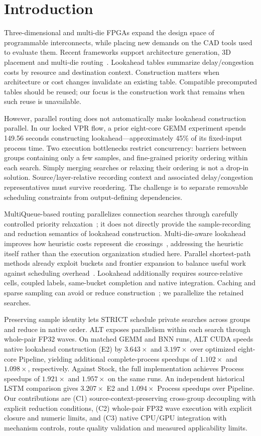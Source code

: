\section{Introduction}
Three-dimensional and multi-die FPGAs expand the design space of programmable interconnects, while placing new demands on the CAD tools used to evaluate them. Recent frameworks support architecture generation, 3D placement and multi-die routing~\cite{lazagna,flatland,multidie}. Lookahead tables summarize delay/congestion costs by resource and destination context. Construction matters when architecture or cost changes invalidate an existing table. Compatible precomputed tables should be reused; our focus is the construction work that remains when such reuse is unavailable.

However, parallel routing does not automatically make lookahead construction parallel. In our locked VPR flow, a prior eight-core GEMM experiment spends 149.56 seconds constructing lookahead---approximately 45\% of its fixed-input process time. Two execution bottlenecks restrict concurrency: barriers between groups containing only a few samples, and fine-grained priority ordering within each search. Simply merging searches or relaxing their ordering is not a drop-in solution. Source/layer-relative recording context and associated delay/congestion representatives must survive reordering. The challenge is to separate removable scheduling constraints from output-defining dependencies.

MultiQueue-based routing parallelizes connection searches through carefully controlled priority relaxation~\cite{multiqueue}; it does not directly provide the sample-recording and reduction semantics of lookahead construction. Multi-die-aware lookahead improves how heuristic costs represent die crossings~\cite{multidie}, addressing the heuristic itself rather than the execution organization studied here. Parallel shortest-path methods already exploit buckets and frontier expansion to balance useful work against scheduling overhead~\cite{delta,gpu_sssp}. Lookahead additionally requires source-relative cells, coupled labels, same-bucket completion and native integration. Caching and sparse sampling can avoid or reduce construction~\cite{vproptions}; we parallelize the retained searches.

Preserving sample identity lets STRICT schedule private searches across groups and reduce in native order. ALT exposes parallelism within each search through whole-pair FP32 waves. On matched GEMM and BNN runs, ALT CUDA speeds native lookahead construction (E2) by $3.643\times$ and $3.197\times$ over optimized eight-core Pipeline, yielding additional complete-process speedups of $1.102\times$ and $1.098\times$, respectively. Against Stock, the full implementation achieves Process speedups of $1.921\times$ and $1.957\times$ on the same runs. An independent historical LSTM comparison gives $3.207\times$ E2 and $1.094\times$ Process speedups over Pipeline. Our contributions are (C1) source-context-preserving cross-group decoupling with explicit reduction conditions, (C2) whole-pair FP32 wave execution with explicit closure and numeric limits, and (C3) native CPU/GPU integration with mechanism controls, route quality validation and measured applicability limits.
